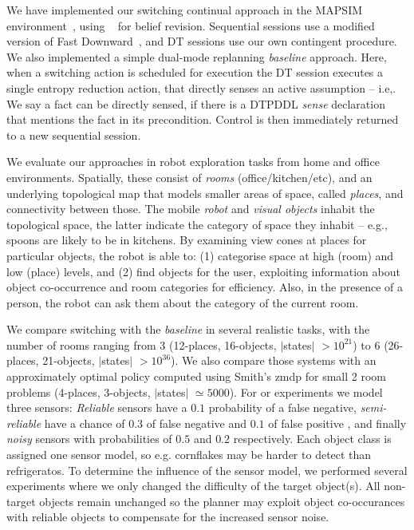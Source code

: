 
We have implemented our switching continual approach in the MAPSIM
environment~\cite{brenner:nebel:jaamas09},
using ~\cite{king:2009} for belief
revision. Sequential sessions use a modified version of Fast
Downward~\cite{fast-downward}, and DT sessions use our own contingent
procedure. We also implemented a simple dual-mode replanning {\em
baseline} approach. Here, when a switching action is scheduled for
execution the DT session executes a single entropy reduction action,
that directly senses an active assumption -- i.e,. We say a fact can
be directly sensed, if there is a DTPDDL {\em sense} declaration that
mentions the fact in its precondition.  Control is then immediately
returned to a new sequential session.


We evaluate our approaches in robot exploration tasks from home and
office environments. Spatially, these consist of {\em rooms}
(office/kitchen/etc), and an underlying topological map that models
smaller areas of space, called {\em places}, and connectivity between
those. The mobile {\em robot} and {\em visual objects} inhabit the
topological space, the latter indicate the category of space they
inhabit -- e.g., spoons are likely to be in kitchens. By examining
view cones at places for particular objects, the robot is able to: (1)
categorise space at high (room) and low (place) levels, and (2) find
objects for the user, exploiting information about object
co-occurrence and room categories for efficiency. Also, in the
presence of a person, the robot can ask them about the category of the
current room.


We compare switching with the {\em baseline} in several realistic
tasks, with the number of rooms ranging from 3 (12-places, 16-objects,
$|$states$|$ $>10^{21}$) to 6 (26-places, 21-objects, $|$states$|$
$>10^{36}$). We also compare those systems with an approximately
optimal policy computed using Smith's {\sc zmdp} for small 2 room
problems (4-places, 3-objects, $|$states$|$ $\simeq 5000$). For or
experiments we model three sensors: {\em Reliable} sensors have a
$0.1$ probability of a false negative, {\em semi-reliable} have a
chance of $0.3$ of false negative and $0.1$ of false positive , and
finally {\em noisy} sensors with probabilities of $0.5$ and $0.2$
respectively. Each object class is assigned one sensor model, so
e.g. cornflakes may be harder to detect than refrigeratos. To
determine the influence of the sensor model, we performed several
experiments where we only changed the difficulty of the target
object(s). All non-target objects remain unchanged so the planner may
exploit object co-occurances with reliable objects to compensate for
the increased sensor noise.


